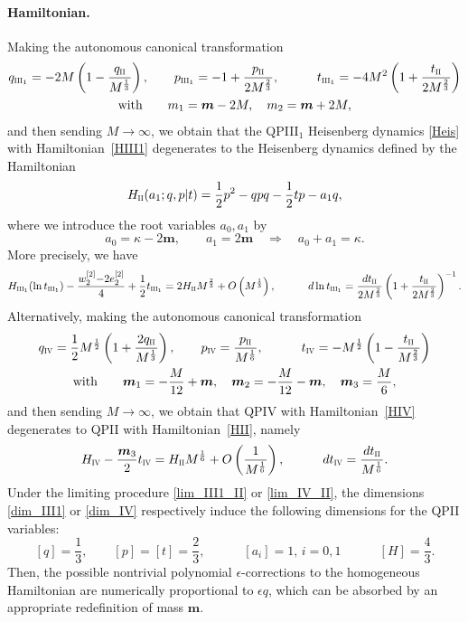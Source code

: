 \documentclass[12pt,a4paper]{article}
\numberwithin{equation}{section}
\newcommand{\IV}{\scalebox{.6}{IV}}
\newcommand{\III}{\scalebox{.6}{III}}
\newcommand{\II}{\scalebox{.6}{II}}
\begin{document}
\paragraph{Hamiltonian.}
Making the autonomous canonical transformation
\begin{multline}\label{lim_III1_II}
q_{\III_1}=-2M\left(1-\frac{q_{\II}}{M^{\frac13}}\right), \qquad  p_{\III_1}=-1+\frac{p_{\II}}{2M^{\frac23}}, \qquad \quad  t_{\III_1}=-4M^2\left(1+\frac{t_{\II}}{2M^{\frac23}}\right) \\  \textrm{with} \qquad m_1=\boldsymbol{m}-2M, \quad m_2=\boldsymbol{m}+2M,
\end{multline}
and then sending $M\rightarrow\infty$, we obtain that the QPIII$_1$ Heisenberg dynamics \eqref{Heis} with Hamiltonian~\eqref{HIII1} degenerates to the Heisenberg dynamics defined by the Hamiltonian
\begin{equation}\label{HII}
H_{\II}(a_1;q,p|t)=\frac12p^2-qpq-\frac12t p-a_1q, 
\end{equation}
where we introduce the root variables $a_0, a_1$ by
\begin{equation}
a_0=\kappa-2\boldsymbol{m}, \qquad a_1=2\boldsymbol{m} \quad \Rightarrow \quad a_0+a_1=\kappa.
\end{equation}
More precisely, we have
\begin{equation}
H_{\III_1}(\ln t_{\III_1})-\frac{w_2^{[2]}{-}2e_2^{[2]}}4+\frac12t_{\III_1}=2H_{\II}M^{\frac23}+O\left(M^{\frac13}\right), \qquad \quad d\ln t_{\III_1}=\frac{dt_{\II}}{2M^{\frac23}}\left(1+\frac{t_{\II}}{2M^{\frac23}}\right)^{-1}. 
\end{equation}
Alternatively, making the autonomous canonical transformation
\begin{multline}\label{lim_IV_II}
q_{\IV}=\frac12M^{\frac12}\left(1+\frac{2q_{\II}}{M^{\frac13}}\right), \qquad p_{\IV}=\frac{p_{\II}}{M^{\frac16}}, \qquad \quad  t_{\IV}=-M^{\frac12}\left(1-\frac{t_{\II}}{M^{\frac23}}\right)\\
\textrm{with} \qquad \boldsymbol{m}_1=-\frac{M}{12}+\boldsymbol{m}, \quad \boldsymbol{m}_2=-\frac{M}{12}-\boldsymbol{m}, \quad 
\boldsymbol{m}_3=\frac{M}6, 
\end{multline}
and then sending $M\rightarrow\infty$, we obtain that QPIV with Hamiltonian~\eqref{HIV} degenerates to QPII with Hamiltonian~\eqref{HII}, namely
\begin{equation}
H_{\IV}-\frac{\boldsymbol{m}_3}2t_{\IV}=H_{\II}M^{\frac16}+O\left(\frac1{M^{\frac16}}\right), \qquad \quad dt_{\IV}=\frac{dt_{\II}}{M^{\frac16}}.   
\end{equation}
Under the limiting procedure \eqref{lim_III1_II} or \eqref{lim_IV_II}, the dimensions \eqref{dim_III1} or \eqref{dim_IV} respectively induce the following dimensions for the QPII variables:
\begin{equation}\label{dim_II}
[q]=\frac13, \qquad [p]=[t]=\frac23, \qquad \quad  [a_i]=1,\, {\scriptstyle i=0,1} \qquad \quad [H]=\frac43.
\end{equation}
Then, the possible nontrivial polynomial $\epsilon$-corrections to the homogeneous Hamiltonian are numerically proportional to $\epsilon q$, which can be absorbed by an appropriate redefinition of mass $\boldsymbol{m}$. 
\end{document}

